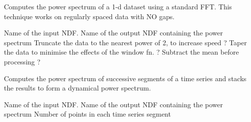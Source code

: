 
\begin{manroutinedescription}

Computes the power spectrum of a 1-d dataset using a standard FFT.
This technique works on regularly spaced data with NO gaps.

\begin{manparametertable}
   Name of the input NDF.
   Name of the output NDF containing the power spectrum
   Truncate the data to the nearest power of 2, to increase speed ?
   Taper the data to minimise the effects of the window fn. ?
   Subtract the mean before processing ?
\end{manparametertable}

\end{manroutinedescription}


\begin{manroutinedescription}

Computes the power spectrum of successive segments of a time
series and stacks the results to form a dynamical power spectrum.

\begin{manparametertable}
   Name of the input NDF.
   Name of the output NDF containing the power spectrum
   Number of points in each time series segment
\end{manparametertable}

\end{manroutinedescription}



